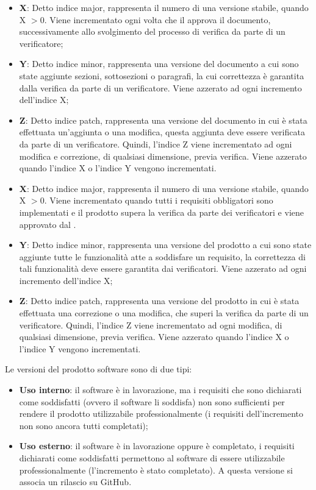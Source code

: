 \begin{itemize}
	\item \textbf{X}: Detto indice major, rappresenta il numero di una versione stabile, quando X $> 0$.
	Viene incrementato ogni volta che il \Responsabile{} approva il documento, successivamente allo svolgimento del processo di verifica da parte di un verificatore;
	\item \textbf{Y}: Detto indice minor, rappresenta una versione del documento a cui sono state aggiunte sezioni, sottosezioni o paragrafi, la cui correttezza è garantita dalla verifica da parte di un verificatore. 
	Viene azzerato ad ogni incremento dell'indice X;
	\item \textbf{Z}: Detto indice patch, rappresenta una versione del documento in cui è stata effettuata un'aggiunta o una modifica, questa aggiunta deve essere verificata da parte di un verificatore.
	Quindi, l'indice Z viene incrementato ad ogni modifica e correzione, di qualsiasi dimensione, previa verifica.
	Viene azzerato quando l'indice X o l'indice Y vengono incrementati.
\end{itemize}

\begin{itemize}
	\item \textbf{X}: Detto indice major, rappresenta il numero di una versione stabile, quando X $> 0$.
	Viene incrementato quando tutti i requisiti obbligatori sono implementati e il prodotto supera la verifica da parte dei verificatori e viene approvato dal \Responsabile{}.
	\item \textbf{Y}: Detto indice minor, rappresenta una versione del prodotto a cui sono state aggiunte tutte le funzionalità atte a soddisfare un requisito, la correttezza di tali funzionalità deve essere garantita dai verificatori.  
	Viene azzerato ad ogni incremento dell'indice X;
	\item \textbf{Z}: Detto indice patch, rappresenta una versione del prodotto in cui è stata effettuata una correzione o una modifica, che superi la verifica da parte di un verificatore.
	Quindi, l'indice Z viene incrementato ad ogni modifica, di qualsiasi dimensione, previa verifica.
	Viene azzerato quando l'indice X o l'indice Y vengono incrementati.
\end{itemize}
Le versioni del prodotto software sono di due tipi:
\begin{itemize}
	\item \textbf{Uso interno}: il software è in lavorazione, ma i requisiti che sono dichiarati come soddisfatti (ovvero il software li soddisfa) non sono sufficienti per rendere il prodotto utilizzabile professionalmente (i requisiti dell'incremento non sono ancora tutti completati);
	\item \textbf{Uso esterno}: il software è in lavorazione oppure è completato, i requisiti dichiarati come soddisfatti permettono al software di essere utilizzabile professionalmente (l'incremento è stato completato). A questa versione si associa un rilascio su GitHub.
\end{itemize}

